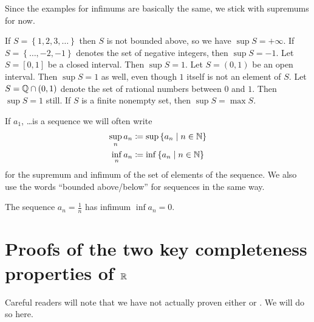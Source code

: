 \begin{example}
	[Supremums]
	Since the examples for infimums are basically the same,
	we stick with supremums for now.
	\begin{enumerate}[(a)]
		\ii If $S = \left\{ 1, 2, 3, \dots \right\}$
		then $S$ is not bounded above, so we have $\sup S = +\infty$.
		\ii If $S = \left\{ \dots, -2, -1 \right\}$
		denotes the set of negative integers, then $\sup S = -1$.
		\ii Let $S = [0,1]$ be a closed interval.
		Then $\sup S = 1$.
		\ii Let $S = (0,1)$ be an open interval.
		Then $\sup S = 1$ as well, even though $1$ itself
		is not an element of $S$.
		\ii Let $S = \mathbb Q \cap (0,1)$ denote the set of rational
		numbers between $0$ and $1$.
		Then $\sup S = 1$ still.
		\ii If $S$ is a finite nonempty set,
		then $\sup S = \max S$.
	\end{enumerate}
\end{example}

\begin{definition}
	If $a_1$, \dots is a sequence we will often write
	\begin{align*}
		\sup_n a_n &\coloneqq \sup \left\{ a_n \mid n \in \mathbb N \right\} \\
		\inf_n a_n &\coloneqq \inf \left\{ a_n \mid n \in \mathbb N \right\}
	\end{align*}
	for the supremum and infimum of the set of elements of the sequence.
	We also use the words ``bounded above/below'' for sequences
	in the same way.
\end{definition}
\begin{example}
	The sequence $a_n = \frac 1n$ has infimum $\inf a_n = 0$.
\end{example}

\section{Proofs of the two key completeness properties of $\mathbb R$}
Careful readers will note that we have not actually
proven either  or .
We will do so here.

